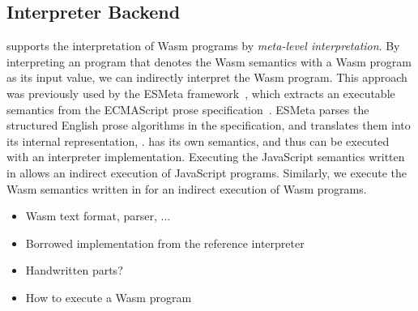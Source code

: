 \subsection{Interpreter Backend}\label{sec:interp} %
\dslname supports the interpretation of Wasm programs by \textit{meta-level interpretation}.
By interpreting an \al program that denotes the Wasm semantics with
a Wasm program as its input value, we can indirectly interpret the Wasm program.
This approach was previously used by the ESMeta framework~\cite{esmeta,jiset},
which extracts an executable semantics from the ECMAScript prose specification~\cite{ecmascript}.
ESMeta parses the structured English prose algorithms in the specification,
and translates them into its internal representation, \ires.
\ires has its own semantics, and thus can be executed with an interpreter implementation.
Executing the JavaScript semantics written in \ires allows an indirect execution of JavaScript programs.
Similarly, we execute the Wasm semantics written in \al for an indirect execution of Wasm programs.

\begin{itemize}
\item Wasm text format, parser, ...
\item Borrowed implementation from the reference interpreter
\item Handwritten parts?
\item How to execute a Wasm program
\end{itemize}


